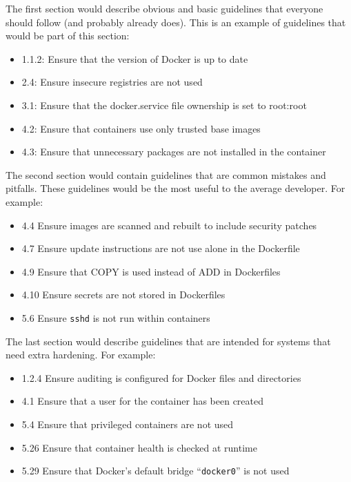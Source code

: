 The first section would describe obvious and basic guidelines that everyone should follow (and probably already does). This is an example of guidelines that would be part of this section:
\begin{itemize}
    \item 1.1.2: Ensure that the version of Docker is up to date
    \item 2.4: Ensure insecure registries are not used
    \item 3.1: Ensure that the docker.service file ownership is set to root:root
    \item 4.2: Ensure that containers use only trusted base images
    \item 4.3: Ensure that unnecessary packages are not installed in the container
\end{itemize}

\hfill

The second section would contain guidelines that are common mistakes and pitfalls. These guidelines would be the most useful to the average developer. For example:
\begin{itemize}
    \item 4.4 Ensure images are scanned and rebuilt to include security patches
    \item 4.7 Ensure update instructions are not use alone in the Dockerfile
    \item 4.9 Ensure that COPY is used instead of ADD in Dockerfiles
    \item 4.10 Ensure secrets are not stored in Dockerfiles
    \item 5.6 Ensure \lstinline{sshd} is not run within containers
\end{itemize}

\hfill

The last section would describe guidelines that are intended for systems that need extra hardening. For example:
\begin{itemize}
    \item 1.2.4 Ensure auditing is configured for Docker files and directories
    \item 4.1 Ensure that a user for the container has been created
    \item 5.4 Ensure that privileged containers are not used
    \item 5.26 Ensure that container health is checked at runtime
    \item 5.29 Ensure that Docker's default bridge ``\lstinline{docker0}'' is not used
\end{itemize}
